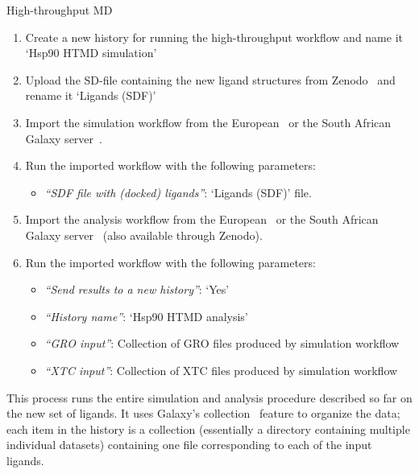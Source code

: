 \documentclass[twocolumn]{bmcart}%
\providecommand{\tightlist}{%
  \setlength{\itemsep}{0pt}\setlength{\parskip}{0pt}}
\begin{document}
\begin{handson_box_colour}{High-throughput MD}

\begin{enumerate}
\def\labelenumi{\arabic{enumi}.}
\tightlist
\item
  Create a new history for running the high-throughput workflow and name it `Hsp90 HTMD simulation'

\item
  Upload the SD-file containing the new ligand structures from Zenodo~\cite{zenodo_sm_2020} and rename it `Ligands (SDF)'
\item
  Import the simulation workflow from the European~\cite{eu_htmd_simulation_workflow} or the South African Galaxy server~\cite{za_htmd_simulation_workflow}.
\item
  Run the imported workflow with the following parameters:

  \begin{itemize}
  \tightlist
  \item
    \emph{``SDF file with (docked) ligands''}: `Ligands (SDF)' file.
  \end{itemize}
\item
  Import the analysis workflow from the European~\cite{eu_htmd_analysis_workflow} or the South African Galaxy server~\cite{za_htmd_analysis_workflow} (also available through Zenodo).
\item
  Run the imported workflow with the following parameters:
  \begin{itemize}
  \tightlist
  \item
    \emph{``Send results to a new history''}: `Yes'
  \item
    \emph{``History name''}: `Hsp90 HTMD analysis'
  \item
    \emph{``GRO input''}: Collection of GRO files produced by simulation workflow
  \item
    \emph{``XTC input''}: Collection of XTC files produced by simulation workflow
  \end{itemize}
\end{enumerate}
\end{handson_box_colour}

This process runs the entire simulation and analysis procedure described so far on the new set of ligands. It uses Galaxy's collection~\cite{gtn_collections} feature to organize the data; each item in the history is a collection (essentially a directory containing multiple individual datasets) containing one file corresponding to each of the input ligands.
\end{document}
